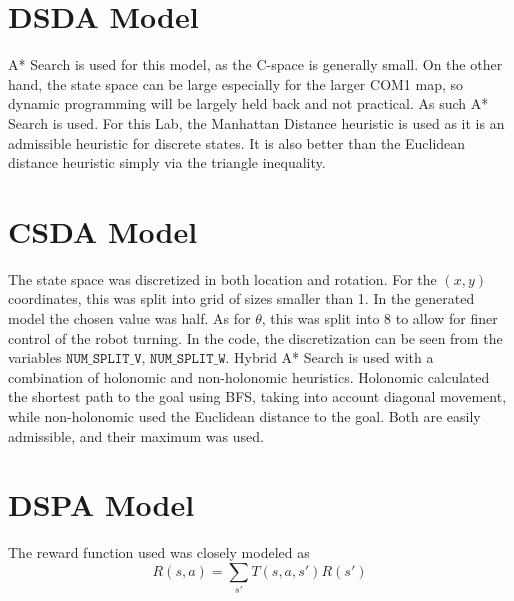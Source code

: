 


    

\section{DSDA Model}

A* Search is used for this model, as the C-space is generally small. 
On the other hand, the state space can be large especially for the larger
COM1 map, so dynamic programming will be largely held back and not practical.
As such A* Search is used. For this Lab, the Manhattan Distance heuristic
is used as it is an admissible heuristic for discrete states. It is also
better than the Euclidean distance heuristic simply via the triangle inequality.

\section{CSDA Model}

The state space was discretized in both location and rotation.
For the $(x,y)$ coordinates, this was split into grid of sizes smaller
than 1. In the generated model the chosen value was half.
As for $\theta$, this was split into 8 to allow for finer control 
of the robot turning.
In the code, the discretization can be seen from the variables
$\texttt{NUM\_SPLIT\_V, NUM\_SPLIT\_W}$.
Hybrid A* Search is used with a combination of holonomic and
non-holonomic heuristics. 
Holonomic calculated the shortest path to the goal using BFS,
taking into account diagonal movement,
while non-holonomic used the Euclidean distance to the goal.
Both are easily admissible, and their maximum was used.

\section{DSPA Model}

The reward function used was closely modeled as
\[R(s,a)=\sum_{s'}T(s,a,s')R(s')\]

